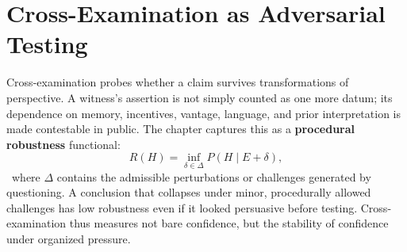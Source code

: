
\chapter{Cross-Examination as Adversarial Testing}
\label{ch:ch038}

Cross-examination probes whether a claim survives transformations of perspective. A witness's assertion is not simply counted as one more datum; its dependence on memory, incentives, vantage, language, and prior interpretation is made contestable in public. The chapter captures this as a \textbf{procedural robustness} functional:
\[
R(H)
=
\inf_{\delta\in\Delta}
P(H\mid E+\delta),
\]
\Definition\ where \(\Delta\) contains the admissible perturbations or challenges generated by questioning.
A conclusion that collapses under minor, procedurally allowed challenges has low robustness even if it looked persuasive before testing. Cross-examination thus measures not bare confidence, but the stability of confidence under organized pressure.
